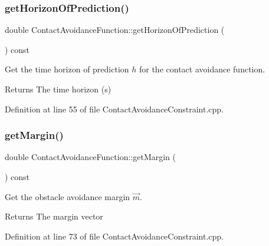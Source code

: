 \subsubsection{\texorpdfstring{get\+Horizon\+Of\+Prediction()}{getHorizonOfPrediction()}}
{\footnotesize\ttfamily double Contact\+Avoidance\+Function\+::get\+Horizon\+Of\+Prediction (\begin{DoxyParamCaption}{ }\end{DoxyParamCaption}) const}

Get the time horizon of prediction $ h $ for the contact avoidance function.

\begin{DoxyReturn}{Returns}
The time horizon (s) 
\end{DoxyReturn}


Definition at line 55 of file Contact\+Avoidance\+Constraint.\+cpp.

\hypertarget{classocra_1_1ContactAvoidanceFunction_a666af8d0a23e115b2f139b048fe6b933}{}\label{classocra_1_1ContactAvoidanceFunction_a666af8d0a23e115b2f139b048fe6b933} 
\subsubsection{\texorpdfstring{get\+Margin()}{getMargin()}}
{\footnotesize\ttfamily double Contact\+Avoidance\+Function\+::get\+Margin (\begin{DoxyParamCaption}{ }\end{DoxyParamCaption}) const}

Get the obstacle avoidance margin $ \vec{m} $.

\begin{DoxyReturn}{Returns}
The margin vector 
\end{DoxyReturn}


Definition at line 73 of file Contact\+Avoidance\+Constraint.\+cpp.

\hypertarget{classocra_1_1ContactAvoidanceFunction_abb04a99b523d82819d2b11bf9a7ea7f9}{}\label{classocra_1_1ContactAvoidanceFunction_abb04a99b523d82819d2b11bf9a7ea7f9} 

